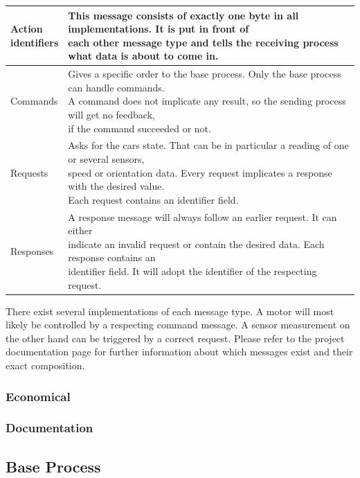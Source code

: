 \begingroup
\begin{tabular}[t]{|l|l|}
\hline
\makecell{Action\\identifiers} & \makecell{This message consists of exactly one byte in all implementations. It is put in front of\\each other message type and tells the receiving process what data is about to come in.}\\
\hline
Commands & \makecell{Gives a specific order to the base process. Only the base process can handle commands.\\A command does not implicate any result, so the sending process will get no feedback,\\if the command succeeded or not.}\\
\hline
Requests & \makecell{Asks for the cars state. That can be in particular a reading of one or several sensors,\\speed or orientation data. Every request implicates a response with the desired value.\\Each request contains an identifier field.}\\
\hline
Responses & \makecell{A response message will always follow an earlier request. It can either\\indicate an invalid request or contain the desired data. Each response contains an\\identifier field. It will adopt the identifier of the respecting request.}\\
\hline
\end{tabular}
\label{tbl:message_definition}
\endgroup

There exist several implementations of each message type. A motor will most likely be controlled by a respecting command message. A sensor measurement on the other hand can be triggered by a correct request. Please refer to the project documentation page \cite{docu} for further information about which messages exist and their exact composition.

\subsubsection{Economical}

\subsubsection{Documentation}

\subsection{Base Process}

